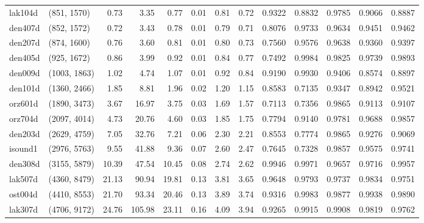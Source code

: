 \begin{tabular}{llrrrrrrrrrrr}
 lak104d &  (851, 1570) &  0.73 &   3.35 &  0.77 & 0.01 &  0.81 &   0.72 &   0.9322 &   0.8832 &    0.9785 &     0.9066 &      0.8887 \\
 den407d &  (852, 1572) &  0.72 &   3.43 &  0.78 & 0.01 &  0.79 &   0.71 &   0.8076 &   0.9733 &    0.9634 &     0.9451 &      0.9462 \\
 den207d &  (874, 1600) &  0.76 &   3.60 &  0.81 & 0.01 &  0.80 &   0.73 &   0.7560 &   0.9576 &    0.9638 &     0.9360 &      0.9397 \\
 den405d &  (925, 1672) &  0.86 &   3.99 &  0.92 & 0.01 &  0.84 &   0.77 &   0.7492 &   0.9984 &    0.9825 &     0.9739 &      0.9893 \\
 den009d & (1003, 1863) &  1.02 &   4.74 &  1.07 & 0.01 &  0.92 &   0.84 &   0.9190 &   0.9930 &    0.9406 &     0.8574 &      0.8897 \\
 den101d & (1360, 2466) &  1.85 &   8.81 &  1.96 & 0.02 &  1.20 &   1.15 &   0.8583 &   0.7135 &    0.9347 &     0.8942 &      0.9521 \\
 orz601d & (1890, 3473) &  3.67 &  16.97 &  3.75 & 0.03 &  1.69 &   1.57 &   0.7113 &   0.7356 &    0.9865 &     0.9113 &      0.9107 \\
 orz704d & (2097, 4014) &  4.73 &  20.76 &  4.60 & 0.03 &  1.85 &   1.75 &   0.7794 &   0.9140 &    0.9781 &     0.9688 &      0.9857 \\
 den203d & (2629, 4759) &  7.05 &  32.76 &  7.21 & 0.06 &  2.30 &   2.21 &   0.8553 &   0.7774 &    0.9865 &     0.9276 &      0.9069 \\
 isound1 & (2976, 5763) &  9.55 &  41.88 &  9.36 & 0.07 &  2.60 &   2.47 &   0.7645 &   0.7328 &    0.9857 &     0.9575 &      0.9741 \\
 den308d & (3155, 5879) & 10.39 &  47.54 & 10.45 & 0.08 &  2.74 &   2.62 &   0.9946 &   0.9971 &    0.9657 &     0.9716 &      0.9957 \\
 lak507d & (4360, 8479) & 21.13 &  90.94 & 19.81 & 0.13 &  3.81 &   3.65 &   0.9648 &   0.9793 &    0.9737 &     0.9834 &      0.9751 \\
 ost004d & (4410, 8553) & 21.70 &  93.34 & 20.46 & 0.13 &  3.89 &   3.74 &   0.9316 &   0.9983 &    0.9877 &     0.9938 &      0.9890 \\
 lak307d & (4706, 9172) & 24.76 & 105.98 & 23.11 & 0.16 &  4.09 &   3.94 &   0.9265 &   0.9915 &    0.9908 &     0.9819 &      0.9762 \\
\bottomrule
\end{tabular}
